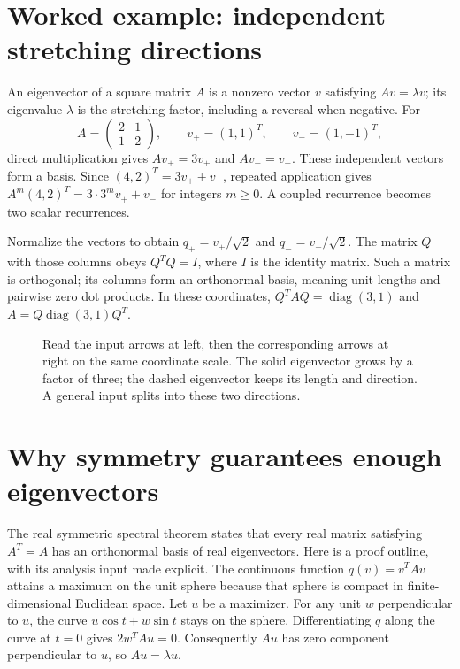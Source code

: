 \section{Worked example: independent stretching directions}
An eigenvector of a square matrix $A$ is a nonzero vector $v$ satisfying
$Av=\lambda v$; its eigenvalue $\lambda$ is the stretching factor,
including a reversal when negative. For
\[
 A=\begin{pmatrix}2&1\\1&2\end{pmatrix},\qquad
 v_+=(1,1)^T,\qquad v_-=(1,-1)^T,
\]
direct multiplication gives $Av_+=3v_+$ and $Av_-=v_-$. These
independent vectors form a basis. Since
$(4,2)^T=3v_++v_-$, repeated application gives
$A^m(4,2)^T=3\cdot3^m v_++v_-$ for integers $m\geq0$.
A coupled recurrence becomes two scalar recurrences.

Normalize the vectors to obtain $q_+=v_+/\sqrt2$ and
$q_-=v_-/\sqrt2$. The matrix $Q$ with those columns obeys
$Q^TQ=I$, where $I$ is the identity matrix. Such a matrix is orthogonal;
its columns form an orthonormal basis, meaning unit lengths and pairwise
zero dot products. In these coordinates,
$Q^TAQ=\operatorname{diag}(3,1)$ and
$A=Q\operatorname{diag}(3,1)Q^T$.

\begin{figure}[htbp]
  \centering
  
  \caption{Read the input arrows at left, then the corresponding arrows at right on the same coordinate scale. The solid eigenvector grows by a factor of three; the dashed eigenvector keeps its length and direction. A general input splits into these two directions.}
  \label{fig:learn:linear_map}
\end{figure}

\section{Why symmetry guarantees enough eigenvectors}
The real symmetric spectral theorem states that every real matrix satisfying
$A^T=A$ has an orthonormal basis of real eigenvectors. Here is a proof
outline, with its analysis input made explicit. The continuous function
$q(v)=v^TAv$ attains a maximum on the unit sphere because that sphere is
compact in finite-dimensional Euclidean space. Let $u$ be a maximizer.
For any unit $w$ perpendicular to $u$, the curve
$u\cos t+w\sin t$ stays on the sphere. Differentiating $q$ along the
curve at $t=0$ gives $2w^TAu=0$. Consequently $Au$ has zero component
perpendicular to $u$, so $Au=\lambda u$.

